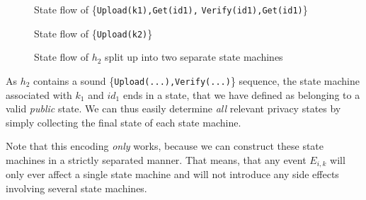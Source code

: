 \begin{figure}[h]
    \begin{minipage}[t]{0.5\textwidth}
        \centering
        \caption*{State flow of \{\texttt{Upload(k1),Get(id1),} \texttt{Verify(id1),Get(id1)}\}}
    \end{minipage}
    \begin{minipage}[t]{0.5\textwidth}
        \centering
        \caption*{State flow of \{\texttt{Upload(k2)}\}}
    \end{minipage}
    \caption{State flow of $h_{2}$ split up into two separate state machines }
\end{figure}

As \(h_2\) contains a sound \{\texttt{Upload(...),Verify(...)}\} sequence, the state machine associated with \(k_1\) and \(id_1\) ends in a state, that we have defined as belonging to a valid \emph{public} state. 
We can thus easily determine \emph{all} relevant privacy states by simply collecting the final state of each state machine.

Note that this encoding \emph{only} works, because we can construct these state machines in a strictly separated manner. That means, that any event \(E_{i,k}\) will only ever affect a single state machine and will not introduce any side effects involving several state machines.

